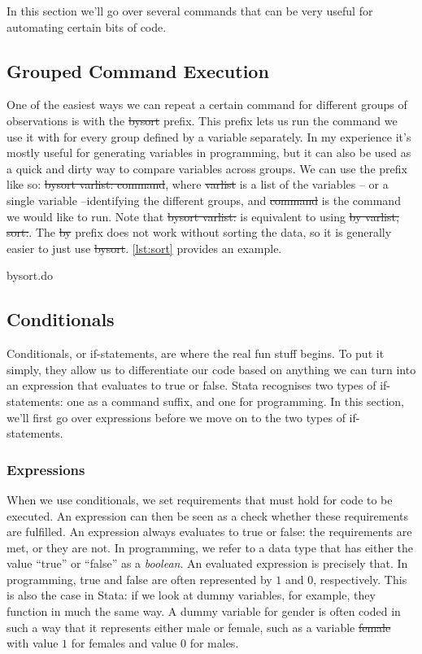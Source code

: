 
In this section we'll go over several commands that can be very useful for automating certain bits of code.

\subsection{Grouped Command Execution}
One of the easiest ways we can repeat a certain command for different groups of observations is with the \st{bysort} prefix.
This prefix lets us run the command we use it with for every group defined by a variable separately.
In my experience it's mostly useful for generating variables in programming,
but it can also be used as a quick and dirty way to compare variables across groups.
We can use the prefix like so: \st{bysort varlist: command},
where \st{varlist} is a list of the variables -- or a single variable --identifying the different groups,
and \st{command} is the command we would like to run.
Note that \st{bysort varlist:} is equivalent to using \st{by varlist, sort:}.
The \st{by} prefix does not work without sorting the data, so it is generally easier to just use \st{bysort}.
\cref{lst:sort} provides an example.

\begin{listing}[htp]
\caption{bysort.do}\label{lst:sort}
\end{listing}

\subsection{Conditionals}
Conditionals, or if-statements, are where the real fun stuff begins.
To put it simply,
they allow us to differentiate our code based on anything we can turn into an expression that evaluates to true or false.
Stata recognises two types of if-statements: one as a command suffix,
and one for programming.
In this section,
we'll first go over expressions before we move on to the two types of if-statements.

\subsubsection{Expressions}
When we use conditionals,
we set requirements that must hold for code to be executed.
An expression can then be seen as a check whether these requirements are fulfilled.
An expression always evaluates to true or false:
the requirements are met, or they are not.
In programming, we refer to a data type that has either the value ``true'' or ``false'' as a \emph{boolean}.
An evaluated expression is precisely that.
In programming,
true and false are often represented by $1$ and $0$, respectively.
This is also the case in Stata:
if we look at dummy variables,
for example,
they function in much the same way.
A dummy variable for gender is often coded in such a way that it represents either male or female,
such as a variable \st{female} with value $1$ for females and value $0$ for males.

